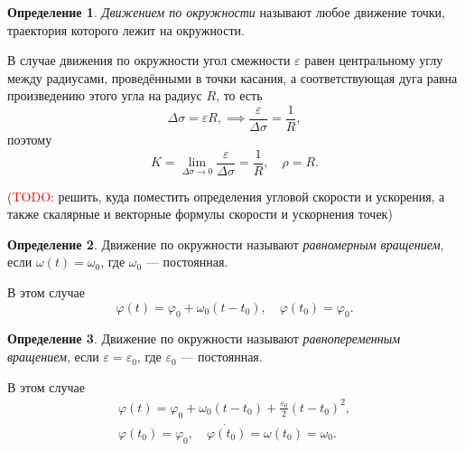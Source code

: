 \documentclass{article}
\theoremstyle{definition}
\newtheorem{definition}{Определение}[section]
\theoremstyle{plain}
\theoremstyle{remark}
\numberwithin{equation}{section}
\begin{document}
\begin{definition}
  \textit{Движением по окружности} называют любое движение точки, траектория
  которого лежит на окружности.
\end{definition}

В случае движения по окружности угол смежности $\varepsilon$ равен центральному
углу между радиусами, проведёнными в точки касания, а соответствующая дуга
равна произведению этого угла на радиус $R$, то есть
\begin{equation*}
  \Delta \sigma = \varepsilon R, \implies
    \frac{\varepsilon}{\Delta \sigma} = \frac{1}{R},
\end{equation*}
поэтому
\begin{equation*}
  K = \lim_{\Delta \sigma \to 0} \frac{\varepsilon}{\Delta \sigma} =
    \frac{1}{R}, \quad \rho = R.
\end{equation*}

(\textcolor{red}{TODO:} решить, куда поместить определения угловой скорости и
ускорения, а также скалярные и векторные формулы скорости и ускорнения точек)

\begin{definition}
  Движение по окружности называют \textit{равномерным вращением}, если
  $\omega(t) = \omega_0$, где $\omega_0$ --- постоянная.

  В этом случае
  \begin{equation*}
    \varphi(t) = \varphi_0 + \omega_0 (t - t_0), \quad \varphi(t_0) = \varphi_0.
  \end{equation*}
\end{definition}

\begin{definition}
  Движение по окружности называют \textit{равнопеременным вращением}, если
  $\varepsilon = \varepsilon_0$, где $\varepsilon_0$ --- постоянная.

  В этом случае
  \begin{equation*}
    \begin{gathered}
      \varphi(t) = \varphi_0 + \omega_0 (t - t_0) +
        \frac{\varepsilon_0}{2} (t - t_0)^2, \\
      \varphi(t_0) = \varphi_0, \quad
        \dot{\varphi(t_0)} = \omega(t_0) = \omega_0.
    \end{gathered}
  \end{equation*}
\end{definition}
\end{document}
